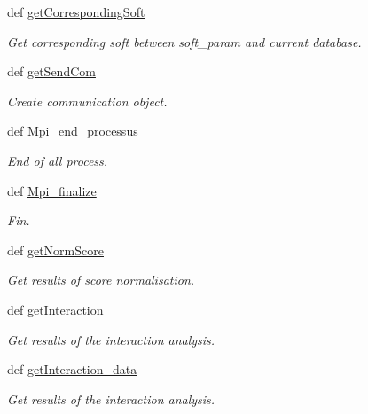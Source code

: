 \begin{DoxyCompactItemize}
def \hyperlink{classirna_1_1iRNA__stat_1_1Mpi_1_1Mpi_a06f832e41a08547ed9bd99ae75d36ba9}{get\-Corresponding\-Soft}
\begin{DoxyCompactList}\small\item\em \-Get corresponding soft between soft\-\_\-param and current database. \end{DoxyCompactList}\item 
def \hyperlink{classirna_1_1iRNA__stat_1_1Mpi_1_1Mpi_a4cdc484fa70d1095c46c4d6a8fa1561f}{get\-Send\-Com}
\begin{DoxyCompactList}\small\item\em \-Create communication object. \end{DoxyCompactList}\item 
def \hyperlink{classirna_1_1iRNA__stat_1_1Mpi_1_1Mpi_ab53cab78d19b69d5e74d13163de955bc}{\-Mpi\-\_\-end\-\_\-processus}
\begin{DoxyCompactList}\small\item\em \-End of all process. \end{DoxyCompactList}\item 
def \hyperlink{classirna_1_1iRNA__stat_1_1Mpi_1_1Mpi_a83e3733457e0330e5b542d835c78d8d2}{\-Mpi\-\_\-finalize}
\begin{DoxyCompactList}\small\item\em \-Fin. \end{DoxyCompactList}\item 
def \hyperlink{classirna_1_1iRNA__stat_1_1Mpi_1_1Mpi_a89c4d4df232d7ffedbdf939b76985281}{get\-Norm\-Score}
\begin{DoxyCompactList}\small\item\em \-Get results of score normalisation. \end{DoxyCompactList}\item 
def \hyperlink{classirna_1_1iRNA__stat_1_1Mpi_1_1Mpi_aa4bd9153b2caf0b35ed7bb1545f23001}{get\-Interaction}
\begin{DoxyCompactList}\small\item\em \-Get results of the interaction analysis. \end{DoxyCompactList}\item 
def \hyperlink{classirna_1_1iRNA__stat_1_1Mpi_1_1Mpi_a35e4a7d6b1b541703a9d48aeb8e8c144}{get\-Interaction\-\_\-data}
\begin{DoxyCompactList}\small\item\em \-Get results of the interaction analysis. \end{DoxyCompactList}\item 

\end{DoxyCompactItemize}
